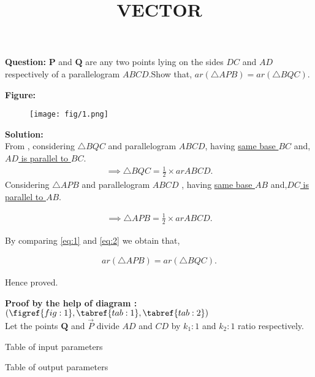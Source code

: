 \documentclass[12pt]{article}
\renewcommand{\vec}{\boldsymbol}
\providecommand{\brak}[1]{\ensuremath{\left(#1\right)}}
\begin{document}
\title{\textbf{VECTOR}}
\date{}
\maketitle
\textbf{Question:} $\vec{P}$ and $\vec{Q}$ are any two points lying on the sides $DC$ and $AD$ respectively of a parallelogram $ABCD$.Show that, $ar\brak{\triangle APB}=ar\brak{\triangle BQC}$.


\textbf{Figure:}
\begin{figure}[H]
    \centering
   \texttt{[image: fig/1.png]}
    \caption{}
    \label{fig:fig:1}
\end{figure}


\textbf{Solution:}\\
From  ,
considering $\triangle BQC$ and parallelogram $ ABCD$, having \underline{same base $BC$} and, \underline{$AD$ is parallel to $BC$}.\\
\begin{align}
\implies \triangle BQC = \frac{1}{2}\times ar ABCD.
  \label{eq:eq:1}
\end{align}
Considering $\triangle APB$ and parallelogram $ABCD$ , having \underline{same base $AB$} and,\underline{$DC$ is parallel to $AB$}.

\begin{align}
\implies \triangle APB = \frac{1}{2}\times ar ABCD.
\label{eq:eq:2}
\end{align}

By comparing \eqref{eq:1} and \eqref{eq:2} we obtain that,

\begin{align}
    ar\brak{\triangle APB} =  ar\brak{\triangle BQC}.
\end{align}
\begin{center}
 Hence proved.

\end{center}

\textbf{Proof by the help of diagram :}\brak{\figref{fig:1},\tabref{tab:1},\tabref{tab:2}}\\
Let the points $\vec{Q}$ and $\Vec{P}$ divide $AD$ and $CD$ by $k_1:1$ and $k_2:1$ ratio respectively.
\begin{table}[H]
   \centering
   
   \caption{Table of input parameters}
   \label{tab:tab:1}
\end{table}




\begin{table}[H]
    \centering                                      
                              
    \caption{Table of output parameters}
	\label{tab:tab:2}
 \end{table}
\end{document}
